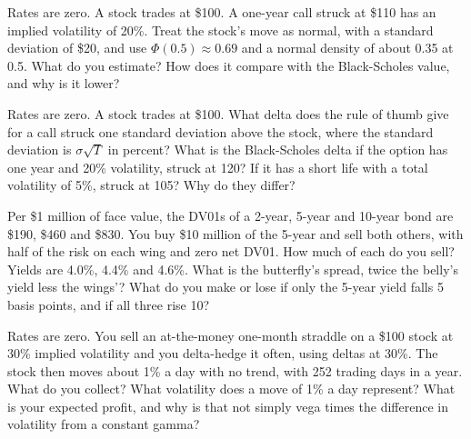 \begin{question}\label{iq:iv2:options-and-bond-arithmetic-at-speed:21}
Rates are zero. A stock trades at \$100. A one-year call struck at \$110 has an implied volatility of 20\%. Treat the stock's move as normal, with a standard deviation of \$20, and use $\Phi(0.5) \approx 0.69$ and a normal density of about 0.35 at 0.5. What do you estimate? How does it compare with the Black-Scholes value, and why is it lower?
\end{question}

\begin{question}\label{iq:iv2:options-and-bond-arithmetic-at-speed:22}
Rates are zero. A stock trades at \$100. What delta does the rule of thumb give for a call struck one standard deviation above the stock, where the standard deviation is $\sigma\sqrt{T}$ in percent? What is the Black-Scholes delta if the option has one year and 20\% volatility, struck at 120? If it has a short life with a total volatility of 5\%, struck at 105? Why do they differ?
\end{question}

\begin{question}\label{iq:iv2:options-and-bond-arithmetic-at-speed:23}
Per \$1 million of face value, the DV01s of a 2-year, 5-year and 10-year bond are \$190, \$460 and \$830. You buy \$10 million of the 5-year and sell both others, with half of the risk on each wing and zero net DV01. How much of each do you sell? Yields are 4.0\%, 4.4\% and 4.6\%. What is the butterfly's spread, twice the belly's yield less the wings'? What do you make or lose if only the 5-year yield falls 5 basis points, and if all three rise 10?
\end{question}

\begin{question}\label{iq:iv2:options-and-bond-arithmetic-at-speed:24}
Rates are zero. You sell an at-the-money one-month straddle on a \$100 stock at 30\% implied volatility and you delta-hedge it often, using deltas at 30\%. The stock then moves about 1\% a day with no trend, with 252 trading days in a year. What do you collect? What volatility does a move of 1\% a day represent? What is your expected profit, and why is that not simply vega times the difference in volatility from a constant gamma?
\end{question}

